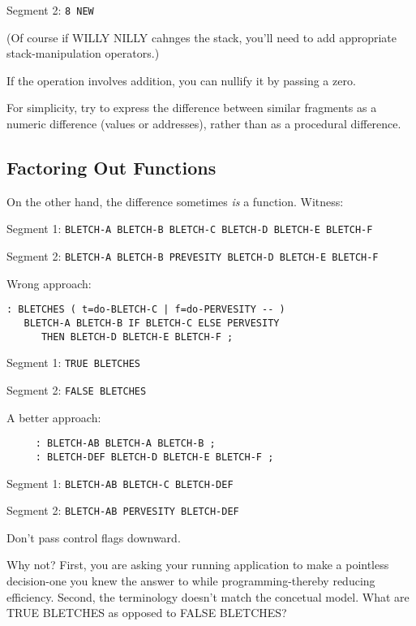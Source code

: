 Segment 2:    \texttt{8 NEW}

\bigskip

\noindent 
(Of course if WILLY NILLY cahnges the stack, you'll need to add appropriate stack-manipulation operators.)

If the operation involves addition, you can nullify it by passing a zero.

\begin{tip}
For simplicity, try to express the difference between similar fragments as a numeric difference (values or addresses), rather than as a procedural difference.
\end{tip}


\subsection{{Factoring Out Functions}}

On the other hand, the difference sometimes \textit{is} a function. Witness:

\bigskip


Segment 1:	\texttt{BLETCH-A BLETCH-B BLETCH-C BLETCH-D BLETCH-E BLETCH-F}

Segment 2:	\texttt{BLETCH-A BLETCH-B PREVESITY BLETCH-D BLETCH-E BLETCH-F}

\bigskip

\noindent
Wrong approach:

\begin{verbatim}
: BLETCHES ( t=do-BLETCH-C | f=do-PERVESITY -- ) 
   BLETCH-A BLETCH-B IF BLETCH-C ELSE PERVESITY 
      THEN BLETCH-D BLETCH-E BLETCH-F ;
\end{verbatim}

\noindent 
Segment 1:	\texttt{TRUE BLETCHES}

\noindent
Segment 2:	\texttt{FALSE BLETCHES}

\bigskip

\noindent 
A better approach:

\begin{verbatim}
     : BLETCH-AB BLETCH-A BLETCH-B ;
     : BLETCH-DEF BLETCH-D BLETCH-E BLETCH-F ;
\end{verbatim}

\indent Segment 1:	\texttt{BLETCH-AB BLETCH-C BLETCH-DEF}

\indent Segment 2:	\texttt{BLETCH-AB PERVESITY BLETCH-DEF}

\begin{tip}
Don't pass control flags downward.
\end{tip}
Why not? First, you are asking your running application to make a pointless decision-one you knew the answer to while programming-thereby reducing efficiency. Second, the terminology doesn't match the concetual model. What are TRUE BLETCHES as opposed to FALSE BLETCHES?

